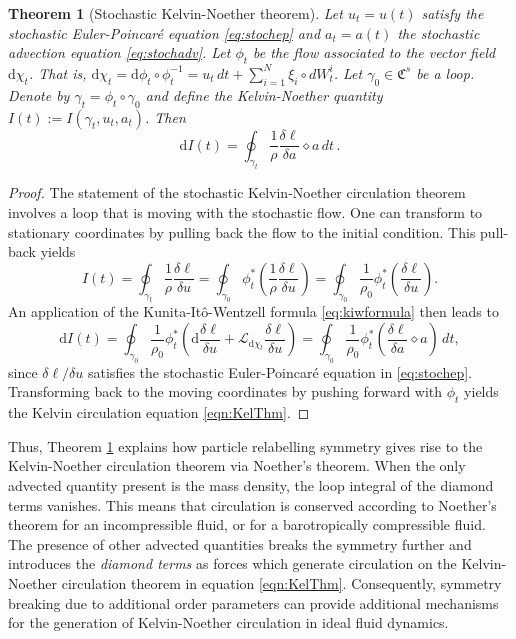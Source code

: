 \documentclass[11pt, oneside]{article}   	%
\numberwithin{equation}{section}
\theoremstyle{plain}
\newtheorem{theorem}{Theorem}[section]
\theoremstyle{definition}
\theoremstyle{remark}
\newcommand{\<}{\langle}
\renewcommand{\>}{\rangle}
\def\rmd{{\mathrm{d}}}
\begin{document}
\begin{theorem}[Stochastic Kelvin-Noether theorem]\label{thm:KelThm}
Let $u_t=u(t)$ satisfy the stochastic Euler-Poincar\'e equation \eqref{eq:stochep} and $a_t=a(t)$ the stochastic advection equation \eqref{eq:stochadv}. Let $\phi_t$ be the flow associated to the vector field ${\rmd}\chi_t$. That is, ${\rmd}\chi_t = {\rmd}\phi_t\circ \phi_t^{-1} = u_t\,dt + \sum_{i=1}^N \xi_i\circ dW_t^i$. Let $\gamma_0\in \mathfrak{C}^s$ be a loop. Denote by $\gamma_t = \phi_t\circ \gamma_0$ and define the Kelvin-Noether quantity $I(t):= I(\gamma_t,u_t,a_t)$. Then 
\begin{equation}
{\rmd}I(t) = \oint_{\gamma_t}\frac{1}{\rho}\frac{\delta\ell}{\delta a}\diamond a\,dt\,.
\label{eqn:KelThm}
\end{equation}
\end{theorem}
\begin{proof}
The statement of the stochastic Kelvin-Noether circulation theorem involves a loop that is moving with the stochastic flow. One can transform to stationary coordinates by pulling back the flow to the initial condition. This pull-back yields
\begin{equation}
I(t) = \oint_{\gamma_t}\frac{1}{\rho}\frac{\delta\ell}{\delta u} = \oint_{\gamma_0}\phi_t^*\left(\frac{1}{\rho}\frac{\delta\ell}{\delta u}\right) = \oint_{\gamma_0}\frac{1}{\rho_0}\phi_t^*\left(\frac{\delta\ell}{\delta u}\right).
\end{equation}
An application of the Kunita-It\^o-Wentzell formula \eqref{eq:kiwformula} then leads to 
\begin{equation}
{\rmd}I(t) = \oint_{\gamma_0}\frac{1}{\rho_0}\phi_t^*\left({\rmd}\frac{\delta\ell}{\delta u} + \mathcal{L}_{{\rmd}\chi_t}\frac{\delta \ell}{\delta u}\right) = \oint_{\gamma_0}\frac{1}{\rho_0}\phi_t^*\left(\frac{\delta\ell}{\delta a}\diamond a\right)\,dt,
\end{equation}
since $\delta\ell/\delta u$ satisfies the stochastic Euler-Poincar\'e equation in \eqref {eq:stochep}. Transforming back to the moving coordinates by pushing forward with $\phi_t$ yields the Kelvin circulation equation \eqref{eqn:KelThm}.
\end{proof}

Thus, Theorem \ref{thm:KelThm} explains how particle relabelling symmetry gives rise to the Kelvin-Noether circulation theorem via Noether's theorem. When the only advected quantity present is the mass density, the loop integral of the diamond terms vanishes. This means that circulation is conserved according to Noether's theorem for an incompressible fluid, or for a barotropically compressible fluid. The presence of other advected quantities breaks the symmetry further and introduces the  \emph{diamond terms} as forces which generate circulation on the Kelvin-Noether circulation theorem in equation \eqref{eqn:KelThm}. Consequently, symmetry breaking due to additional order parameters can provide additional mechanisms for the generation of Kelvin-Noether circulation in ideal fluid dynamics.
\end{document}
